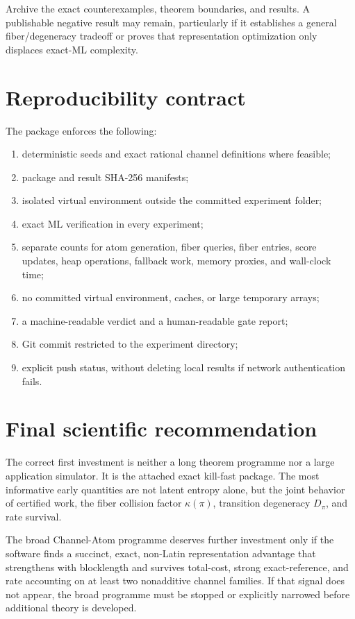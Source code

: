 \documentclass[11pt]{article}
\theoremstyle{definition}
\theoremstyle{remark}
\begin{document}
Archive the exact counterexamples, theorem boundaries, and results. A publishable negative result may remain, particularly if it establishes a general fiber/degeneracy tradeoff or proves that representation optimization only displaces exact-ML complexity.

\section{Reproducibility contract}

The package enforces the following:
\begin{enumerate}
\item deterministic seeds and exact rational channel definitions where feasible;
\item package and result SHA-256 manifests;
\item isolated virtual environment outside the committed experiment folder;
\item exact ML verification in every experiment;
\item separate counts for atom generation, fiber queries, fiber entries, score updates, heap operations, fallback work, memory proxies, and wall-clock time;
\item no committed virtual environment, caches, or large temporary arrays;
\item a machine-readable verdict and a human-readable gate report;
\item Git commit restricted to the experiment directory;
\item explicit push status, without deleting local results if network authentication fails.
\end{enumerate}

\section{Final scientific recommendation}

\begin{executivebox}
The correct first investment is neither a long theorem programme nor a large application simulator. It is the attached exact kill-fast package. The most informative early quantities are not latent entropy alone, but the joint behavior of certified work, the fiber collision factor $\kappa(\pi)$, transition degeneracy $D_\pi$, and rate survival.

The broad Channel-Atom programme deserves further investment only if the software finds a succinct, exact, non-Latin representation advantage that strengthens with blocklength and survives total-cost, strong exact-reference, and rate accounting on at least two nonadditive channel families. If that signal does not appear, the broad programme must be stopped or explicitly narrowed before additional theory is developed.
\end{executivebox}
\end{document}
